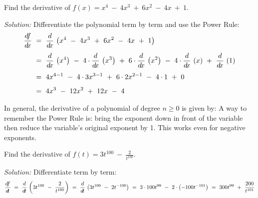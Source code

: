 \begin{exmp}\label{exmp:polyderiv}
 Find the derivative of $f(x) = x^4 ~-~ 4x^3 ~+~ 6x^2 ~-~ 4x ~+~ 1$.\vspace{1mm}
 \par\noindent\emph{Solution:} Differentiate the polynomial term by term and use
 the Power Rule:
 \begin{align*}
  \dfdx ~&=~ \ddx\,\left(x^4 ~-~ 4x^3 ~+~ 6x^2 ~-~ 4x ~+~ 1\right)\\[4pt]
  &=~ \ddx\,\left(x^4\right) ~-~ 4 \cdot \ddx\,\left(x^3\right) ~+~ 6 \cdot \ddx\,\left(x^2\right)
      ~-~ 4 \cdot \ddx\,\left(x\right) ~+~ \ddx\,\left(1\right)\\[4pt]
  &=~ 4x^{4-1} ~-~ 4 \cdot 3x^{3-1} ~+~ 6 \cdot 2x^{2-1} ~-~ 4 \cdot 1 ~+~ 0\\[4pt]
  &=~ 4x^3 ~-~ 12x^2 ~+~ 12x ~-~ 4
 \end{align*}
\end{exmp}
\divider
\vspace{3mm}

In general, the derivative of a polynomial of degree $n \ge 0$ is given by:
\newpage
A way to remember the Power Rule is: bring the exponent down in front of the variable
then reduce the variable's original exponent by 1. This works even for negative exponents.

\begin{exmp}\label{exmp:polyderiv2}
 Find the derivative of $f(t) = 3t^{100} ~-~ \frac{2}{t^{100}}$.\vspace{1mm}
 \par\noindent\emph{Solution:} Differentiate term by term:
 \begin{displaymath}
  \frac{d\negmedspace f}{d\!t} ~=~ \frac{d}{d\!t}\,\left(3t^{100} ~-~ \frac{2}{t^{100}}\right) ~=~
             \frac{d}{d\!t}\,\left( 3t^{100} ~-~ 2t^{-100}\right)
  ~=~ 3 \cdot 100t^{99} ~-~ 2 \cdot \left(-100t^{-101}\right) ~=~ 300t^{99} ~+~ \frac{200}{t^{101}}
 \end{displaymath}
\end{exmp}
\divider
\vspace{3mm}

